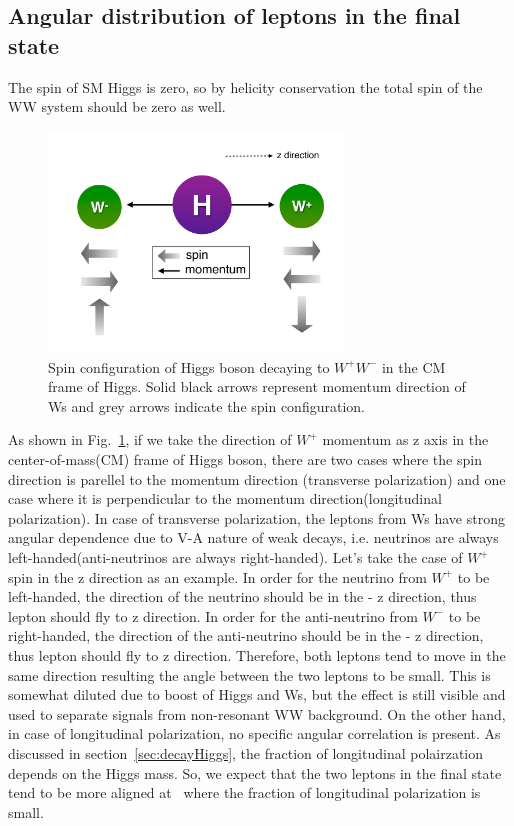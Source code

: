 %
\subsection{Angular distribution of leptons in the final state}

The spin of SM Higgs is zero, so by helicity conservation the total spin 
of the WW system should be zero as well. 
\begin{figure}[htp]
\centering
\includegraphics[width=0.7\textwidth]{figures/HiggsSpin.pdf}
\caption{Spin configuration of Higgs boson decaying to $W^+W^-$ in the CM frame of Higgs.
Solid black arrows represent momentum direction of Ws and grey arrows indicate 
the spin configuration.}
\label{fig:HiggsSpin}
\end{figure}
As shown in Fig.~\ref{fig:HiggsSpin}, if we take 
the direction of $W^+$ momentum as z axis in the center-of-mass(CM) frame of Higgs boson,
there are two cases where the spin direction is parellel to the 
momentum direction (transverse polarization) and one case where 
it is perpendicular to the momentum direction(longitudinal polarization). 
In case of transverse polarization, the leptons from Ws have strong 
angular dependence due to V-A nature of weak decays, i.e. neutrinos 
are always left-handed(anti-neutrinos are always right-handed). 
Let's take the case of $W^+$ spin in the z direction as an example.
In order for the neutrino from $W^+$ to be left-handed, the direction 
of the neutrino should be in the - z direction, thus lepton should 
fly to z direction. In order for the anti-neutrino from $W^-$ to be 
right-handed, the direction of the anti-neutrino should be in the 
- z direction, thus lepton should fly to z direction.
Therefore, both leptons tend to move in the same direction 
resulting the angle between the two leptons to be small. 
This is somewhat diluted due to boost of Higgs and Ws, 
but the effect is still visible and used to separate signals 
from non-resonant WW background. 
On the other hand, in case of longitudinal polarization, 
no specific angular correlation is present. 
As discussed in section~\ref{sec:decayHiggs}, the fraction of longitudinal 
polairzation depends on the Higgs mass. So, we expect that the two leptons 
in the final state tend to be more aligned at \mHi\ where the fraction of longitudinal 
polarization is small. 


